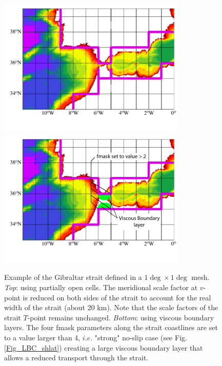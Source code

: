 \begin{figure}[!tbp] 	 \begin{center}
\includegraphics[width=0.80\textwidth]{./TexFiles/Figures/Fig_Gibraltar.pdf}
\includegraphics[width=0.80\textwidth]{./TexFiles/Figures/Fig_Gibraltar2.pdf}
\caption{	\label{Fig_MISC_strait_hand} 
Example of the Gibraltar strait defined in a $1\deg \times 1\deg$ mesh. 
\textit{Top}: using partially open cells. The meridional scale factor at $v$-point 
is reduced on both sides of the strait to account for the real width of the strait 
(about 20 km). Note that the scale factors of the strait $T$-point remains unchanged. 
\textit{Bottom}: using viscous boundary layers. The four fmask parameters 
along the strait coastlines are set to a value larger than 4, $i.e.$ "strong" no-slip 
case (see Fig.\ref{Fig_LBC_shlat}) creating a large viscous boundary layer 
that allows a reduced transport through the strait.}
\end{center}   \end{figure}

